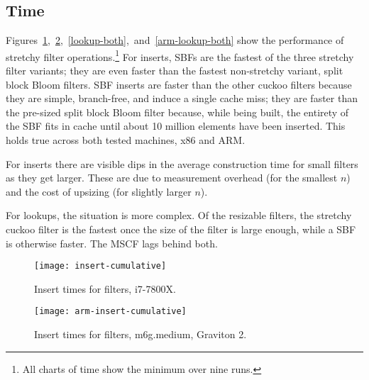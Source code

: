 \documentclass[letterpaper,twocolumn,10pt]{article}
\newcommand{\taffy}{stretchy}
\newcommand{\TBF}{SBF}
\newcommand{\MTCF}{MSCF}
\newcommand{\taffy}{taffy}
\newcommand{\TBF}{TBF}
\newcommand{\MTCF}{MTCF}
\begin{document}
\subsection{Time}

Figures~\ref{insert-time},~\ref{arm-insert-time},~\ref{lookup-both},~and~\ref{arm-lookup-both} show the performance of \taffy{} filter operations.\footnote{All charts of time show the minimum over nine runs.}
For inserts, \TBF{}s are the fastest of the three \taffy{} filter variants; they are even faster than the fastest non-\taffy{} variant, split block Bloom filters.
\TBF{} inserts are faster than the other cuckoo filters because they are simple, branch-free, and induce a single cache miss; they are faster than the pre-sized split block Bloom filter because, while being built, the entirety of the \TBF{} fits in cache until about 10 million elements have been inserted.
This holds true across both tested machines, x86 and ARM.

For inserts there are visible dips in the average construction time for small filters as they get larger.
These are due to measurement overhead (for the smallest $n$) and the cost of upsizing (for slightly larger $n$).

For lookups, the situation is more complex.
Of the resizable filters, the \taffy{} cuckoo filter is the fastest once the size of the filter is large enough, while a \TBF{} is otherwise faster.
The \MTCF{} lags behind both.

\begin{figure}[b!]
  \texttt{[image: insert-cumulative]}
  \caption{
    \label{insert-time}
    Insert times for filters, i7-7800X.
  }
\end{figure}

\begin{figure}[b!]
  \texttt{[image: arm-insert-cumulative]}
  \caption{
    \label{arm-insert-time}
    Insert times for filters, m6g.medium, Graviton 2.
  }
\end{figure}
\end{document}
